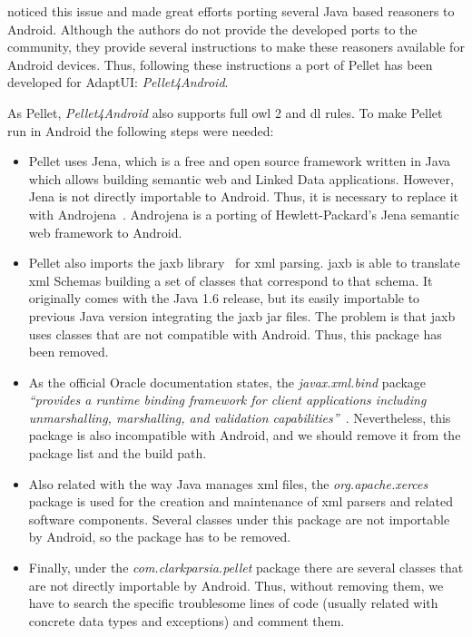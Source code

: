 \citet{yus_android_2013} noticed this issue and made great efforts porting
several Java based reasoners to Android. Although the authors do not provide the
developed ports to the community, they provide several instructions to make these
reasoners available for Android devices. Thus, following these instructions a port
of Pellet has been developed for AdaptUI: \textit{Pellet4Android}.

As Pellet, \textit{Pellet4Android} also supports full \ac{owl} 2 and \ac{dl} 
rules. To make Pellet run in Android the following steps were needed:

\begin{itemize}
  \item Pellet uses Jena, which is a free and open source framework written in
  Java which allows building semantic web and Linked Data applications. However,
  Jena is not directly importable to Android. Thus, it is necessary to replace it
  with Androjena~\citep{androjena}. Androjena
  is a porting of Hewlett-Packard's Jena semantic web framework to Android. 
  
  \item Pellet also imports the \ac{jaxb} library~\citep{jaxb} for \ac{xml} 
  parsing. \ac{jaxb} is able to translate \ac{xml} Schemas building a set of 
  classes that correspond to that schema. It originally comes with the Java 1.6 
  release, but its easily importable to previous Java version integrating the 
  \ac{jaxb} jar files. The problem is that \ac{jaxb} uses classes that are not 
  compatible with Android. Thus, this package has been removed. 
  
  \item As the official Oracle documentation states, the \textit{javax.xml.bind}
  package \textit{``provides a runtime binding framework for client applications
  including unmarshalling, marshalling, and validation capabilities''}~\citep{javax_xml_bind}.
  Nevertheless, this package is also incompatible with Android, and we should
  remove it from the package list and the build path.
  
  \item Also related with the way Java manages \ac{xml} files, the 
  \textit{org.apache.xerces}~\citep{xerces} package
  is used for the creation and maintenance of \ac{xml} parsers and related
  software components. Several classes under this package are not importable by
  Android, so the package has to be removed.
  
  \item Finally, under the \textit{com.clarkparsia.pellet} package there are several
  classes that are not directly importable by Android. Thus, without removing them,
  we have to search the specific troublesome lines of code (usually related with
  concrete data types and exceptions) and comment them. 
\end{itemize}

